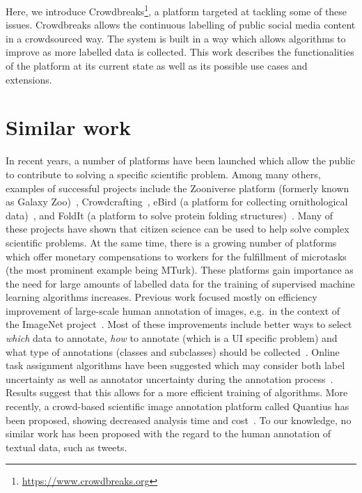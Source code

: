 \documentclass[a4paper, 11pt]{article}
\begin{document}
Here, we introduce Crowdbreaks\footnote{\url{https://www.crowdbreaks.org}}, a platform targeted at tackling some of these issues. 
Crowdbreaks allows the continuous labelling of public social media content in a crowdsourced way.
The system is built in a way which allows algorithms to improve as more labelled data is collected.
This work describes the functionalities of the platform at its current state as well as its possible use cases and extensions.

\section{Similar work}
In recent years, a number of platforms have been launched which allow the public to contribute to solving a specific scientific problem.
Among many others, examples of successful projects include the Zooniverse platform (formerly known as Galaxy Zoo)~\cite{Simpson2014}, Crowdcrafting~\cite{crowdcrafting}, eBird (a platform for collecting ornithological data)~\cite{Wood2011}, and FoldIt (a platform to solve protein folding structures)~\cite{Khatib2010}.
Many of these projects have shown that citizen science can be used to help solve complex scientific problems.
At the same time, there is a growing number of platforms which offer monetary compensations to workers for the fulfillment of microtasks (the most prominent example being MTurk).
These platforms gain importance as the need for large amounts of labelled data for the training of supervised machine learning algorithms increases.
Previous work focused mostly on efficiency improvement of large-scale human annotation of images, e.g.\ in the context of the ImageNet project~\cite{Russakovsky2015}. 
Most of these improvements include better ways to select \textit{which} data to annotate, \textit{how} to annotate (which is a UI specific problem) and what type of annotations (classes and subclasses) should be collected~\cite{kovashka2016crowdsourcing}.
Online task assignment algorithms have been suggested which may consider both label uncertainty as well as annotator uncertainty during the annotation process~\cite{Welinder2010,Ho2012}.
Results suggest that this allows for a more efficient training of algorithms.
More recently, a crowd-based scientific image annotation platform called Quantius has been proposed, showing decreased analysis time and cost~\cite{Hughes2017}.
To our knowledge, no similar work has been proposed with the regard to the human annotation of textual data, such as tweets.
\end{document}
